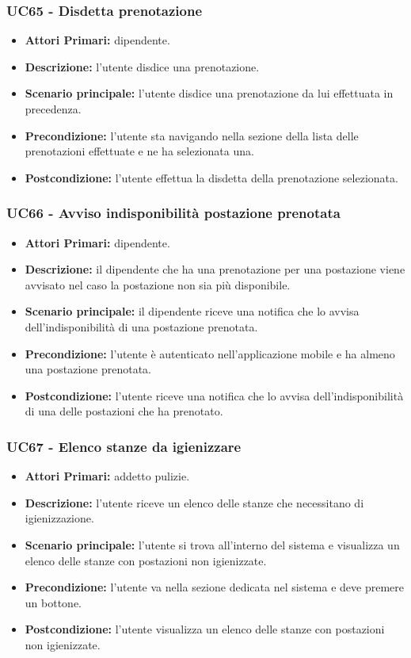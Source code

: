 \subsubsection{ UC65 - Disdetta prenotazione}
\begin{itemize}
	\item\textbf{Attori Primari:} dipendente.
	\item\textbf{Descrizione:} l’utente disdice una prenotazione. 
	\item\textbf{Scenario principale:} l’utente disdice una prenotazione da lui effettuata in precedenza.
	\item\textbf{Precondizione:} l'utente sta navigando nella sezione della lista delle prenotazioni effettuate e ne ha selezionata una.
	\item\textbf{Postcondizione:} l’utente effettua la disdetta della prenotazione selezionata.
\end{itemize}

\subsubsection{ UC66 - Avviso indisponibilità postazione prenotata }
\begin{itemize}
	\item\textbf{Attori Primari:} dipendente.
	\item\textbf{Descrizione:} il dipendente che ha una prenotazione per una postazione viene avvisato nel caso la postazione non sia più disponibile.
	\item\textbf{Scenario principale:} il dipendente riceve una notifica che lo avvisa dell'indisponibilità di una postazione prenotata.
	\item\textbf{Precondizione:} l’utente è autenticato nell'applicazione mobile e ha almeno una postazione prenotata.
	\item\textbf{Postcondizione:} l'utente riceve una notifica che lo avvisa dell'indisponibilità di una delle postazioni che ha prenotato.
\end{itemize}

\subsubsection{UC67 - Elenco stanze da igienizzare}
\begin{itemize}
           	\item\textbf{Attori Primari:} addetto pulizie.
           	\item\textbf{Descrizione:} l'utente riceve un elenco delle stanze che necessitano di igienizzazione.
           	\item\textbf{Scenario principale:} l'utente si trova all'interno del sistema e visualizza un elenco delle stanze con postazioni non igienizzate.
           	\item\textbf{Precondizione:} l'utente va nella sezione dedicata nel sistema e deve premere un bottone.
           	\item\textbf{Postcondizione:} l'utente visualizza un elenco delle stanze con postazioni non igienizzate.
\end{itemize}
